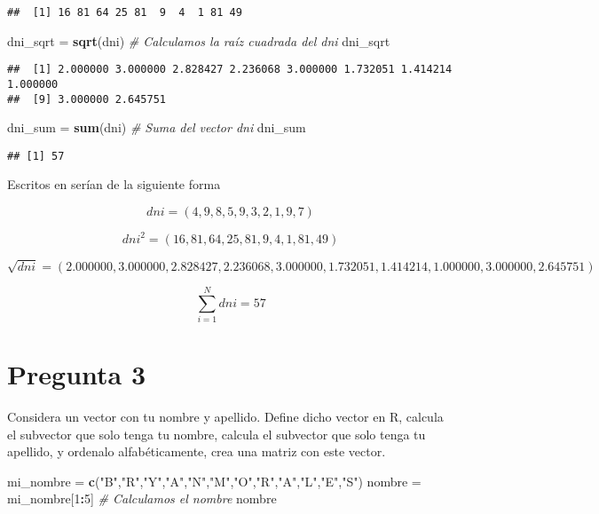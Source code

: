 \documentclass[
]{article}
\newenvironment{Shaded}{\begin{snugshade}}{\end{snugshade}}
\newcommand{\CommentTok}[1]{\textcolor[rgb]{0.56,0.35,0.01}{\textit{#1}}}
\newcommand{\DecValTok}[1]{\textcolor[rgb]{0.00,0.00,0.81}{#1}}
\newcommand{\KeywordTok}[1]{\textcolor[rgb]{0.13,0.29,0.53}{\textbf{#1}}}
\newcommand{\NormalTok}[1]{#1}
\newcommand{\OperatorTok}[1]{\textcolor[rgb]{0.81,0.36,0.00}{\textbf{#1}}}
\newcommand{\StringTok}[1]{\textcolor[rgb]{0.31,0.60,0.02}{#1}}
\begin{document}
\begin{verbatim}
##  [1] 16 81 64 25 81  9  4  1 81 49
\end{verbatim}

\begin{Shaded}
\begin{Highlighting}[]
\NormalTok{dni_sqrt =}\StringTok{ }\KeywordTok{sqrt}\NormalTok{(dni) }\CommentTok{# Calculamos la raíz cuadrada del dni}
\NormalTok{dni_sqrt}
\end{Highlighting}
\end{Shaded}

\begin{verbatim}
##  [1] 2.000000 3.000000 2.828427 2.236068 3.000000 1.732051 1.414214 1.000000
##  [9] 3.000000 2.645751
\end{verbatim}

\begin{Shaded}
\begin{Highlighting}[]
\NormalTok{dni_sum =}\StringTok{ }\KeywordTok{sum}\NormalTok{(dni) }\CommentTok{# Suma del vector dni}
\NormalTok{dni_sum}
\end{Highlighting}
\end{Shaded}

\begin{verbatim}
## [1] 57
\end{verbatim}

Escritos en \LaTex{} serían de la siguiente forma

\[
  dni = (4,9,8,5,9,3,2,1,9,7)
\]

\[
  dni^2 = (16, 81, 64, 25, 81,  9,  4,  1, 81, 49)
\]

\[
  \sqrt{dni} = (2.000000, 3.000000, 2.828427, 2.236068, 3.000000, 1.732051, 1.414214, 1.000000, 3.000000, 2.645751)
\]

\[
  \sum_{i=1}^{N} dni = 57
\]

\hypertarget{pregunta-3}{%
\section{Pregunta 3}\label{pregunta-3}}

Considera un vector con tu nombre y apellido. Define dicho vector en R,
calcula el subvector que solo tenga tu nombre, calcula el subvector que
solo tenga tu apellido, y ordenalo alfabéticamente, crea una matriz con
este vector.

\begin{Shaded}
\begin{Highlighting}[]
\NormalTok{mi_nombre =}\StringTok{ }\KeywordTok{c}\NormalTok{(}\StringTok{"B"}\NormalTok{,}\StringTok{"R"}\NormalTok{,}\StringTok{"Y"}\NormalTok{,}\StringTok{"A"}\NormalTok{,}\StringTok{"N"}\NormalTok{,}\StringTok{"M"}\NormalTok{,}\StringTok{"O"}\NormalTok{,}\StringTok{"R"}\NormalTok{,}\StringTok{"A"}\NormalTok{,}\StringTok{"L"}\NormalTok{,}\StringTok{"E"}\NormalTok{,}\StringTok{"S"}\NormalTok{)}
\NormalTok{nombre =}\StringTok{ }\NormalTok{mi_nombre[}\DecValTok{1}\OperatorTok{:}\DecValTok{5}\NormalTok{] }\CommentTok{# Calculamos el nombre}
\NormalTok{nombre}
\end{Highlighting}
\end{Shaded}
\end{document}
